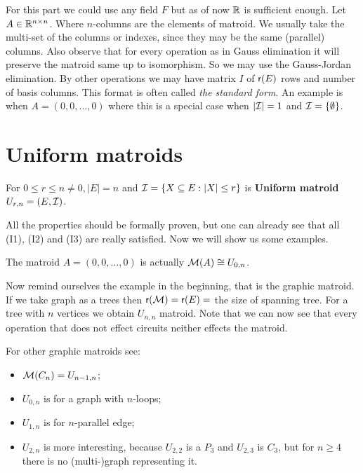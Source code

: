 For this part we could use any field $F$ but as of now $\mathbb{R}$ is sufficient enough. Let $A \in \mathbb{R}^{n \times n}$. Where $n$-columns are the elements of matroid. We usually take the multi-set of the columns or indexes, since they may be the same (parallel) columns. Also observe that for every operation as in Gauss elimination it will preserve the matroid same up to isomorphism. So we may use the Gauss-Jordan elimination. By other operations we may have matrix $I$ of $\operatorname{\textsf{r}}(E)$ rows and number of basis columns. This format is often called \textit{the standard form}. An example is when $A = (0, 0, \dots, 0)$ where this is a special case when $|\mathcal{I}| = 1$ and $\mathcal{I} = \{\emptyset\}$.

\section{Uniform matroids}

\begin{defn}
	For $0 \leq r \leq n \neq 0, |E| = n$ and $\mathcal{I} = \{X \subseteq E : |X| \leq r\}$ is \textbf{Uniform matroid} $U_{r,n} = (E, \mathcal{I})$.
\end{defn}

All the properties should be formally proven, but one can already see that all (I1), (I2) and (I3) are really satisfied. Now we will show us some examples.

\begin{example}
	The matroid $A = (0, 0, \dots, 0)$ is actually $\mathcal{M}(A) \cong U_{0,n}$.
\end{example}

\begin{example}
	Now remind ourselves the example in the beginning, that is the graphic matroid. If we take graph as a trees then $\operatorname{\textsf{r}}(\mathcal{M}) = \operatorname{\textsf{r}}(E) =$ the size of spanning tree. For a tree with $n$ vertices we obtain $U_{n,n}$ matroid. Note that we can now see that every operation that does not effect circuits neither effects the matroid.
\end{example}

\begin{example}
	For other graphic matroids see:
	
	\begin{itemize}
		\item $\mathcal{M}(C_n) = U_{n-1,n}$;
		\item $U_{0,n}$ is for a graph with $n$-loops;
		\item $U_{1,n}$ is for $n$-parallel edge;
		\item $U_{2,n}$ is more interesting, because $U_{2,2}$ is a $P_3$ and $U_{2,3}$ is $C_3$, but for $n \geq 4$ there is no (multi-)graph representing it.
	\end{itemize}
\end{example}

